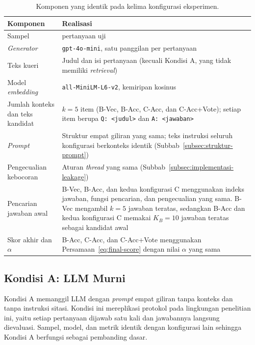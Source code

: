 \begin{table}[!htbp]
\centering
\small
\caption{Komponen yang identik pada kelima konfigurasi eksperimen.}
\label{tab:komponen-bersama}
\renewcommand{\arraystretch}{1.2}
\begin{tabularx}{\textwidth}{|>{\raggedright\arraybackslash}p{3.6cm}|>{\raggedright\arraybackslash}X|}
\hline
\textbf{Komponen} & \textbf{Realisasi} \\
\hline
Sampel & 384 pertanyaan uji \\
\hline
\emph{Generator} & \texttt{gpt-4o-mini}, satu panggilan per pertanyaan \\
\hline
Teks kueri & Judul dan isi pertanyaan (kecuali Kondisi A, yang tidak memiliki \emph{retrieval}) \\
\hline
Model \emph{embedding} & \texttt{all-MiniLM-L6-v2}, kemiripan kosinus \\
\hline
Jumlah konteks dan teks kandidat & $k=5$ item (B-Vec, B-Acc, C-Acc, dan C-Acc+Vote); setiap item berupa \texttt{Q: <judul>} dan \texttt{A: <jawaban>} \\
\hline
\emph{Prompt} & Struktur empat giliran yang sama; teks instruksi seluruh konfigurasi berkonteks identik (Subbab~\ref{subsec:struktur-prompt}) \\
\hline
Pengecualian kebocoran & Aturan \emph{thread} yang sama (Subbab~\ref{subsec:implementasi-leakage}) \\
\hline
Pencarian jawaban awal & B-Vec, B-Acc, dan kedua konfigurasi C menggunakan indeks jawaban, fungsi pencarian, dan pengecualian yang sama. B-Vec mengambil $k=5$ jawaban teratas, sedangkan B-Acc dan kedua konfigurasi C memakai $K_B=10$ jawaban teratas sebagai kandidat awal \\
\hline
Skor akhir dan $\alpha$ & B-Acc, C-Acc, dan C-Acc+Vote menggunakan Persamaan~\eqref{eq:final-score} dengan nilai $\alpha$ yang sama \\
\hline
\end{tabularx}
\end{table}

\subsection{Kondisi A: LLM Murni}
\label{subsec:implementasi-kondisi-a}

Kondisi A memanggil LLM dengan \emph{prompt} empat giliran tanpa konteks dan tanpa instruksi sitasi. Kondisi ini mereplikasi protokol \textcite{DaSilva2025} pada lingkungan penelitian ini, yaitu setiap pertanyaan dijawab satu kali dan jawabannya langsung dievaluasi. Sampel, model, dan metrik identik dengan konfigurasi lain sehingga Kondisi A berfungsi sebagai pembanding dasar.

